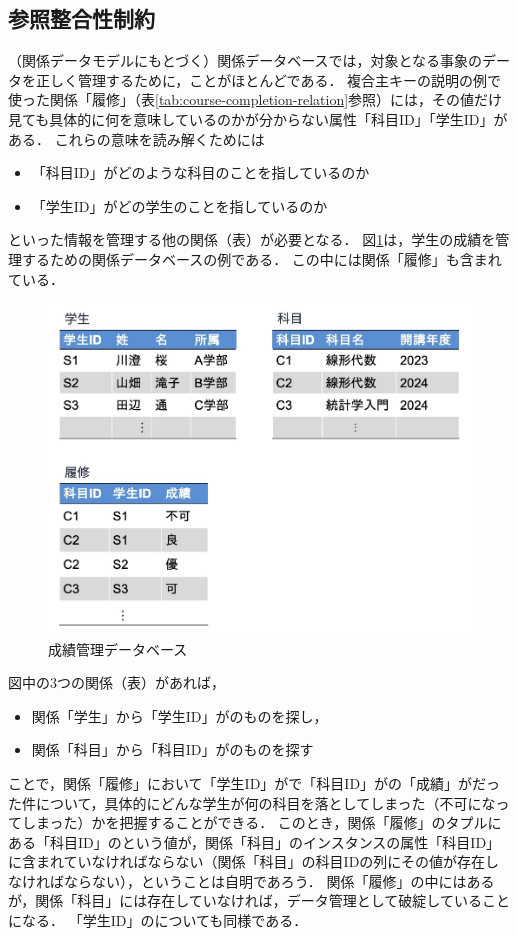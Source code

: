 \subsection{参照整合性制約}
（関係データモデルにもとづく）関係データベースでは，対象となる事象のデータを正しく管理するために，ことがほとんどである．
複合主キーの説明の例で使った関係「履修」（表\ref{tab:course-completion-relation}参照）には，その値だけ見ても具体的に何を意味しているのかが分からない属性「科目ID」「学生ID」がある．
これらの意味を読み解くためには
\begin{itemize}
\item 「科目ID」がどのような科目のことを指しているのか
\item 「学生ID」がどの学生のことを指しているのか
\end{itemize}
といった情報を管理する他の関係（表）が必要となる．
図\ref{fig:score-db}は，学生の成績を管理するための関係データベースの例である．
この中には関係「履修」も含まれている．
\begin{figure}[tb]
    \centering
    \includegraphics[width=1.0\textwidth]{figure/score-db.jpg}
    \caption{成績管理データベース}
    \label{fig:score-db}
\end{figure}
図中の3つの関係（表）があれば，
\begin{itemize}
\item 関係「学生」から「学生ID」がのものを探し，
\item 関係「科目」から「科目ID」がのものを探す
\end{itemize}
ことで，関係「履修」において「学生ID」がで「科目ID」がの「成績」がだった件について，具体的にどんな学生が何の科目を落としてしまった（不可になってしまった）かを把握することができる．
このとき，関係「履修」のタプルにある「科目ID」のという値が，関係「科目」のインスタンスの属性「科目ID」に含まれていなければならない（関係「科目」の科目IDの列にその値が存在しなければならない），ということは自明であろう．
関係「履修」の中にはあるが，関係「科目」には存在していなければ，データ管理として破綻していることになる．
「学生ID」のについても同様である．

